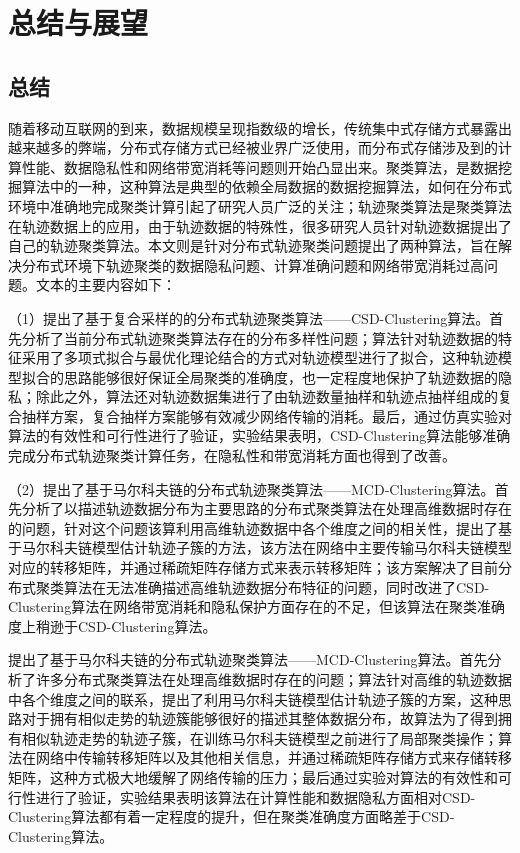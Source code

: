 \chapter{总结与展望}

\section{总结}

随着移动互联网的到来，数据规模呈现指数级的增长，传统集中式存储方式暴露出越来越多的弊端，分布式存储方式已经被业界广泛使用，而分布式存储涉及到的计算性能、数据隐私性和网络带宽消耗等问题则开始凸显出来。聚类算法，是数据挖掘算法中的一种，这种算法是典型的依赖全局数据的数据挖掘算法，如何在分布式环境中准确地完成聚类计算引起了研究人员广泛的关注；轨迹聚类算法是聚类算法在轨迹数据上的应用，由于轨迹数据的特殊性，很多研究人员针对轨迹数据提出了自己的轨迹聚类算法。本文则是针对分布式轨迹聚类问题提出了两种算法，旨在解决分布式环境下轨迹聚类的数据隐私问题、计算准确问题和网络带宽消耗过高问题。文本的主要内容如下：

（1）提出了基于复合采样的的分布式轨迹聚类算法——CSD-Clustering算法。首先分析了当前分布式轨迹聚类算法存在的分布多样性问题；算法针对轨迹数据的特征采用了多项式拟合与最优化理论结合的方式对轨迹模型进行了拟合，这种轨迹模型拟合的思路能够很好保证全局聚类的准确度，也一定程度地保护了轨迹数据的隐私；除此之外，算法还对轨迹数据集进行了由轨迹数量抽样和轨迹点抽样组成的复合抽样方案，复合抽样方案能够有效减少网络传输的消耗。最后，通过仿真实验对算法的有效性和可行性进行了验证，实验结果表明，CSD-Clustering算法能够准确完成分布式轨迹聚类计算任务，在隐私性和带宽消耗方面也得到了改善。

（2）提出了基于马尔科夫链的分布式轨迹聚类算法——MCD-Clustering算法。首先分析了以描述轨迹数据分布为主要思路的分布式聚类算法在处理高维数据时存在的问题，针对这个问题该算利用高维轨迹数据中各个维度之间的相关性，提出了基于马尔科夫链模型估计轨迹子簇的方法，该方法在网络中主要传输马尔科夫链模型对应的转移矩阵，并通过稀疏矩阵存储方式来表示转移矩阵；该方案解决了目前分布式聚类算法在无法准确描述高维轨迹数据分布特征的问题，同时改进了CSD-Clustering算法在网络带宽消耗和隐私保护方面存在的不足，但该算法在聚类准确度上稍逊于CSD-Clustering算法。

提出了基于马尔科夫链的分布式轨迹聚类算法——MCD-Clustering算法。首先分析了许多分布式聚类算法在处理高维数据时存在的问题；算法针对高维的轨迹数据中各个维度之间的联系，提出了利用马尔科夫链模型估计轨迹子簇的方案，这种思路对于拥有相似走势的轨迹簇能够很好的描述其整体数据分布，故算法为了得到拥有相似轨迹走势的轨迹子簇，在训练马尔科夫链模型之前进行了局部聚类操作；算法在网络中传输转移矩阵以及其他相关信息，并通过稀疏矩阵存储方式来存储转移矩阵，这种方式极大地缓解了网络传输的压力；最后通过实验对算法的有效性和可行性进行了验证，实验结果表明该算法在计算性能和数据隐私方面相对CSD-Clustering算法都有着一定程度的提升，但在聚类准确度方面略差于CSD-Clustering算法。

